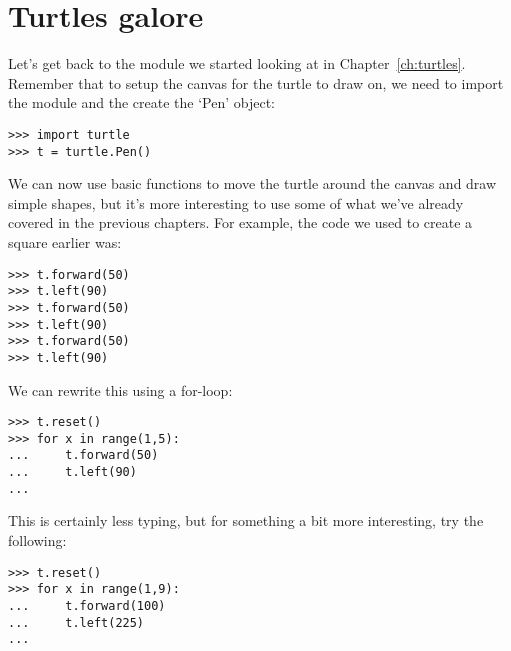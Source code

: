 

\chapter{Turtles galore}\label{ch:turtlesgalore}

Let's get back to the  module we started looking at in Chapter~\ref{ch:turtles}. Remember that to setup the canvas for the turtle to draw on, we need to import the module and the create the `Pen' object:

\begin{listing}
\begin{verbatim}
>>> import turtle
>>> t = turtle.Pen()
\end{verbatim}
\end{listing}

We can now use basic functions to move the turtle around the canvas and draw simple shapes, but it's more interesting to use some of what we've already covered in the previous chapters.  For example, the code we used to create a square earlier was:

\begin{listing}
\begin{verbatim}
>>> t.forward(50)
>>> t.left(90)
>>> t.forward(50)
>>> t.left(90)
>>> t.forward(50)
>>> t.left(90)
\end{verbatim}
\end{listing} 

\noindent
We can rewrite this using a for-loop:

\begin{listing}
\begin{verbatim}
>>> t.reset()
>>> for x in range(1,5):
...     t.forward(50)
...     t.left(90)
...
\end{verbatim}
\end{listing}

This is certainly less typing, but for something a bit more interesting, try the following:

\begin{listing}
\begin{verbatim}
>>> t.reset()
>>> for x in range(1,9):
...     t.forward(100)
...     t.left(225)
...
\end{verbatim}
\end{listing}

